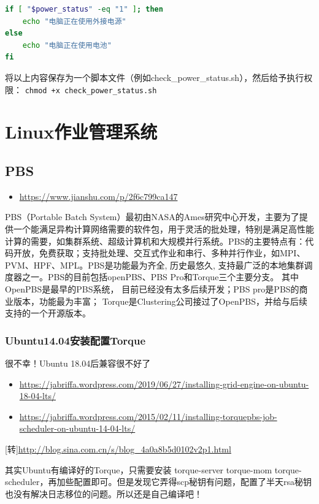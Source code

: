 {\begin{lstlisting}[language=sh]
if [ "$power_status" -eq "1" ]; then
    echo "电脑正在使用外接电源"
else
    echo "电脑正在使用电池"
fi
\end{lstlisting}
将以上内容保存为一个脚本文件（例如check\_power\_status.sh），然后给予执行权限：
\verb|chmod +x check_power_status.sh|



\chapter{Linux作业管理系统}
\section{PBS}
\begin{itemize}
\item \url{https://www.jianshu.com/p/2f6c799ca147}
\end{itemize}


PBS（Portable Batch System）最初由NASA的Ames研究中心开发，主要为了提供一个能满足异构计算网络需要的软件包，用于灵活的批处理，特别是满足高性能计算的需要，如集群系统、超级计算机和大规模并行系统。PBS的主要特点有：代码开放，免费获取；支持批处理、交互式作业和串行、多种并行作业，如MPI、PVM、HPF、MPL。PBS是功能最为齐全, 历史最悠久, 支持最广泛的本地集群调度器之一。PBS的目前包括openPBS、PBS Pro和Torque三个主要分支。 其中OpenPBS是最早的PBS系统， 目前已经没有太多后续开发；PBS pro是PBS的商业版本，功能最为丰富； Torque是Clustering公司接过了OpenPBS，并给与后续支持的一个开源版本。


\subsection{Ubuntu14.04安装配置Torque}
{\color{red} 很不幸！Ubuntu 18.04后兼容很不好了}
\begin{itemize}
\item \url{https://jabriffa.wordpress.com/2019/06/27/installing-grid-engine-on-ubuntu-18-04-lts/}
\item \url{https://jabriffa.wordpress.com/2015/02/11/installing-torquepbs-job-scheduler-on-ubuntu-14-04-lts/}
\end{itemize}


[转]\url{http://blog.sina.com.cn/s/blog_4a0a8b5d0102v2p1.html}

其实Ubuntu有编译好的Torque，只需要安装 torque-server torque-mom torque-scheduler，再加些配置即可。但是发现它弄得scp秘钥有问题，配置了半天rsa秘钥也没有解决日志移位的问题。所以还是自己编译吧！

}
